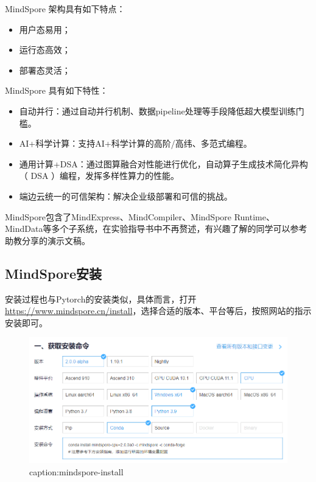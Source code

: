 MindSpore 架构具有如下特点：
\begin{itemize}
    \item 用户态易用；
    \item 运行态高效；
    \item 部署态灵活；
\end{itemize}

MindSpore 具有如下特性：
\begin{itemize}
    \item 自动并行：通过自动并行机制、数据pipeline处理等手段降低超大模型训练门槛。
    \item AI+科学计算：支持AI+科学计算的高阶/高纬、多范式编程。
    \item 通用计算+DSA：通过图算融合对性能进行优化，自动算子生成技术简化异构（ DSA ）编程，发挥多样性算力的性能。
    \item 端边云统一的可信架构：解决企业级部署和可信的挑战。
\end{itemize}


MindSpore包含了MindExpress、MindCompiler、MindSpore Runtime、MindData等多个子系统，在实验指导书中不再赘述，有兴趣了解的同学可以参考助教分享的演示文稿。


\subsection{MindSpore安装}

安装过程也与Pytorch的安装类似，具体而言，打开\url{https://www.mindspore.cn/install}，选择合适的版本、平台等后，按照网站的指示安装即可。

\begin{figure}[htbp]
	\centering
	\includegraphics[width=1\textwidth]{figures/mindspore-install.png}
	\caption{caption:mindspore-install}
	\label{fig:mindspore-install}
\end{figure}

